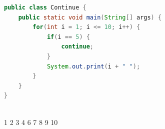 \vspace{0.5cm}


\begin{lstlisting}[language=Java]
public class Continue {
    public static void main(String[] args) {
        for(int i = 1; i <= 10; i++) {
            if(i == 5) {
                continue;
            }
            System.out.print(i + " ");
        }
    }
}
\end{lstlisting}

\begin{tcolorbox}
	 \\
	1 2 3 4 6 7 8 9 10
\end{tcolorbox}

\newpage